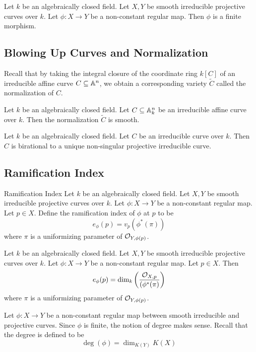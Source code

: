 \documentclass[a4paper]{article}
\begin{document}
\begin{prp}{}{} Let $k$ be an algebraically closed field. Let $X,Y$ be smooth irreducible projective curves over $k$. Let $\phi:X\to Y$ be a non-constant regular map. Then $\phi$ is a finite morphism. 
\end{prp}

\subsection{Blowing Up Curves and Normalization}
Recall that by taking the integral closure of the coordinate ring $k[C]$ of an irreducible affine curve $C\subseteq\mathbb{A}^n$, we obtain a corresponding variety $\widetilde{C}$ called the normalization of $C$. 

\begin{prp}{}{} Let $k$ be an algebraically closed field. Let $C\subseteq\mathbb{A}_k^n$ be an irreducible affine curve over $k$. Then the normalization $\widetilde{C}$ is smooth. 
\end{prp}

\begin{thm}{}{} Let $k$ be an algebraically closed field. Let $C$ be an irreducible curve over $k$. Then $C$ is birational to a unique non-singular projective irreducible curve. 
\end{thm}

\subsection{Ramification Index}
\begin{defn}{Ramification Index}{} Let $k$ be an algebraically closed field. Let $X,Y$ be smooth irreducible projective curves over $k$. Let $\phi:X\to Y$ be a non-constant regular map. Let $p\in X$. Define the ramification index of $\phi$ at $p$ to be $$e_\phi(p)=v_p(\phi^\ast(\pi))$$ where $\pi$ is a uniformizing parameter of $\mathcal{O}_{Y,\phi(p)}$. 
\end{defn}

\begin{lmm}{}{} Let $k$ be an algebraically closed field. Let $X,Y$ be smooth irreducible projective curves over $k$. Let $\phi:X\to Y$ be a non-constant regular map. Let $p\in X$. Then $$e_\phi(p)=\dim_k\left(\frac{\mathcal{O}_{X,p}}{(\phi^\ast(\pi)}\right)$$ where $\pi$ is a uniformizing parameter of $\mathcal{O}_{Y,\phi(p)}$. 
\end{lmm}

Let $\phi:X\to Y$ be a non-constant regular map between smooth irreducible and projective curves. Since $\phi$ is finite, the notion of degree makes sense. Recall that the degree is defined to be $$\deg(\phi)=\dim_{K(Y)}K(X)$$
\end{document}

